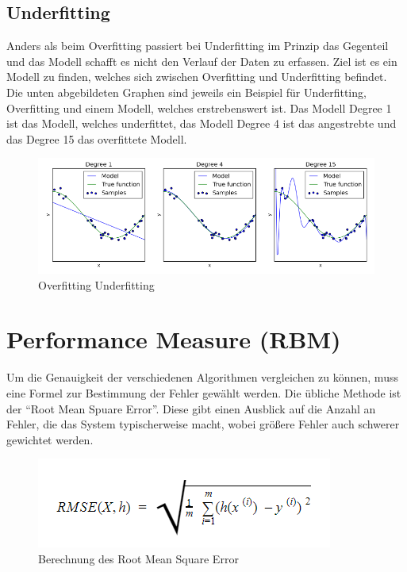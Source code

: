 \subsection{Underfitting}
\label{sec:underfitting}
Anders als beim Overfitting passiert bei Underfitting im Prinzip das Gegenteil und das Modell schafft es nicht den Verlauf der Daten zu erfassen\cite[S.~214.]{WML}.
Ziel ist es ein Modell zu finden, welches sich zwischen Overfitting und Underfitting befindet. Die unten abgebildeten Graphen sind jeweils ein Beispiel für Underfitting, Overfitting und einem Modell, welches erstrebenswert ist. Das Modell Degree 1 ist das Modell, welches underfittet, das Modell Degree 4 ist das angestrebte und das Degree 15 das overfittete Modell.
\newline
\begin{figure}
	\includegraphics[width=1.0\textwidth]{../Bilder/OverUnderfitting.PNG}
	\caption{Overfitting Underfitting}
\end{figure}


\section{Performance Measure (RBM)}
\label{sec:performanceMeasure}
Um die Genauigkeit der verschiedenen Algorithmen vergleichen zu können, muss eine Formel zur Bestimmung der Fehler gewählt werden. 
Die übliche Methode ist der “Root Mean Spuare Error”. Diese gibt einen Ausblick auf die Anzahl an Fehler, die das System typischerweise macht, wobei größere Fehler auch schwerer gewichtet werden\cite[S.~39.]{AG}.
\newline
\begin{figure}
	\includegraphics[]{../Bilder/Berechnung.PNG}
	\caption{Berechnung des Root Mean Square Error}
\end{figure}


